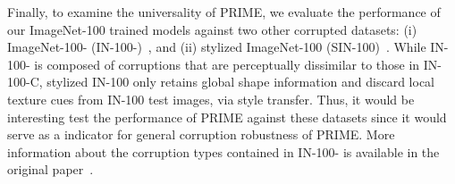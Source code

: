 \documentclass[runningheads]{llncs}
\begin{document}
Finally, to examine the universality of PRIME, we evaluate the performance of our ImageNet-100 trained models against two other corrupted datasets: (i) ImageNet-100- (IN-100-)~\cite{cbar2021}, and (ii) stylized ImageNet-100 (SIN-100)~\cite{styleimagenet2018}. While IN-100- is composed of corruptions that are perceptually dissimilar to those in IN-100-C, stylized IN-100 only retains global shape information and discard local texture cues from IN-100 test images, via style transfer. Thus, it would be interesting test the performance of PRIME against these datasets since it would serve as a indicator for general corruption robustness of PRIME. More information about the corruption types contained in IN-100- is available in the original paper~\cite{cbar2021}.

\begin{table*}[b!]
\centering
\footnotesize
\caption{Classification accuracy of different methods on IN-100-C, IN-100- and Stylized IN-100 (SIN-100) with ResNet-18.}
\label{tab:results-per-corruption-cbar100}
\end{table*}
\end{document}
